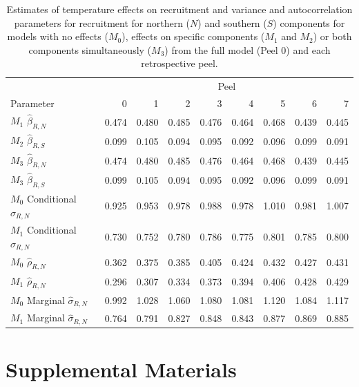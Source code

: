 \documentclass[
]{article}
\begin{document}
\begin{table}

\caption{\label{tab:beta-sig-peel-table}Estimates of temperature effects on recruitment and variance and autocorrelation parameters for recruitment for northern ($N$) and southern ($S$) components for models with no effects ($M_0$), effects on specific components ($M_1$ and $M_2$) or both components simultaneously ($M_3$) from the full model (Peel 0) and each retrospective peel.}
\centering
\begin{tabular}[t]{lrrrrrrrr}
\toprule
\multicolumn{1}{c}{ } & \multicolumn{8}{c}{Peel} \\
\cmidrule(l{3pt}r{3pt}){2-9}
Parameter & 0 & 1 & 2 & 3 & 4 & 5 & 6 & 7\\
\midrule
$M_{1}$ $\widehat{\beta}_{R,N}$ & 0.474 & 0.480 & 0.485 & 0.476 & 0.464 & 0.468 & 0.439 & 0.445\\
$M_{2}$ $\widehat{\beta}_{R,S}$ & 0.099 & 0.105 & 0.094 & 0.095 & 0.092 & 0.096 & 0.099 & 0.091\\
$M_{3}$ $\widehat{\beta}_{R,N}$ & 0.474 & 0.480 & 0.485 & 0.476 & 0.464 & 0.468 & 0.439 & 0.445\\
$M_{3}$ $\widehat{\beta}_{R,S}$ & 0.099 & 0.105 & 0.094 & 0.095 & 0.092 & 0.096 & 0.099 & 0.091\\
$M_{0}$ Conditional $\widehat{\sigma}_{R,N}$ & 0.925 & 0.953 & 0.978 & 0.988 & 0.978 & 1.010 & 0.981 & 1.007\\
\addlinespace
$M_{1}$ Conditional $\widehat{\sigma}_{R,N}$ & 0.730 & 0.752 & 0.780 & 0.786 & 0.775 & 0.801 & 0.785 & 0.800\\
$M_{0}$ $\widehat{\rho}_{R,N}$ & 0.362 & 0.375 & 0.385 & 0.405 & 0.424 & 0.432 & 0.427 & 0.431\\
$M_{1}$ $\widehat{\rho}_{R,N}$ & 0.296 & 0.307 & 0.334 & 0.373 & 0.394 & 0.406 & 0.428 & 0.429\\
$M_{0}$ Marginal $\widehat{\sigma}_{R,N}$ & 0.992 & 1.028 & 1.060 & 1.080 & 1.081 & 1.120 & 1.084 & 1.117\\
$M_{1}$ Marginal $\widehat{\sigma}_{R,N}$ & 0.764 & 0.791 & 0.827 & 0.848 & 0.843 & 0.877 & 0.869 & 0.885\\
\bottomrule
\end{tabular}
\end{table}

\clearpage

\hypertarget{supplemental-materials}{%
\section*{Supplemental Materials}\label{supplemental-materials}}
\end{document}
